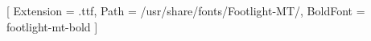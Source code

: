 [
	Extension = .ttf,
	Path = /usr/share/fonts/Footlight-MT/,
	BoldFont = footlight-mt-bold
]



%
%

